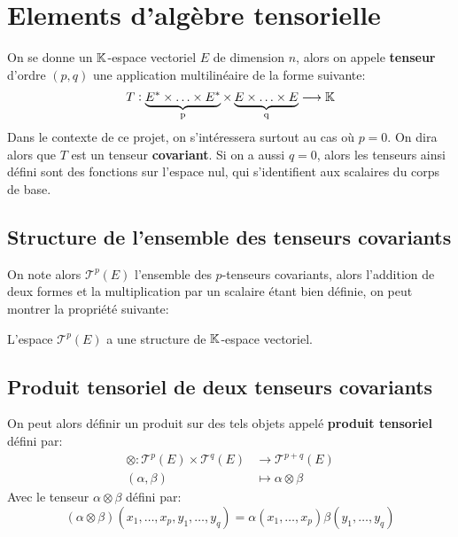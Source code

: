 \chapter{Elements d'algèbre tensorielle}
   On se donne un \(\mathbb{K}\)-espace vectoriel \(E\) de dimension \( n \), alors on appele \textbf{tenseur} d'ordre \((p, q)\) une application multilinéaire de la forme suivante:
   \begin{align*}
      T : \underbrace{E^* \times \ldots \times E^*}_\text{p} \times \underbrace{E \times \ldots \times E}_\text{q} \longrightarrow \mathbb{K}
   \end{align*}
   Dans le contexte de ce projet, on s'intéressera surtout au cas où \( p = 0 \). On dira alors que \( T \) est un tenseur \textbf{covariant}. Si on a aussi \( q = 0 \), alors les tenseurs ainsi défini sont des fonctions sur l'espace nul, qui s'identifient aux scalaires du corps de base.
   \section{Structure de l'ensemble des tenseurs covariants}
   On note alors \(\mathscr{T}^p(E)\) l'ensemble des \(p\)-tenseurs covariants, alors l'addition de deux formes et la multiplication par un scalaire étant bien définie, on peut montrer la propriété suivante:
   \begin{center}
      L'espace \( \mathscr{T}^p(E) \) a une structure de \( \mathbb{K} \)-espace vectoriel.
   \end{center}
   \section{Produit tensoriel de deux tenseurs covariants}
   On peut alors définir un produit sur des tels objets appelé \textbf{produit tensoriel} défini par:
   \begin{align*}
      \otimes : \mathscr{T}^p(E) \times \mathscr{T}^q(E) &\longrightarrow \mathscr{T}^{p+q}(E)\\
      (\alpha, \beta) &\longmapsto \alpha \otimes \beta
   \end{align*}
   Avec le tenseur \(\alpha \otimes \beta\) défini par:
   \[
      (\alpha \otimes \beta)(x_1, \ldots, x_p, y_1, \ldots, y_q) = \alpha(x_1, \ldots, x_p)\beta(y_1, \ldots, y_q)
   \]

